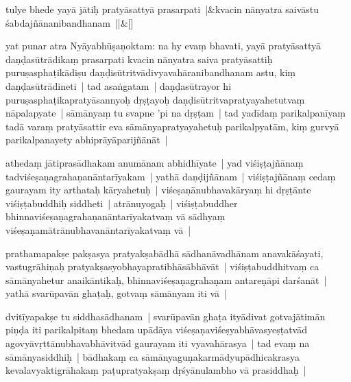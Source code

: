 \documentclass[article,12pt,a4paper]{memoir}%
\newcounter{parCount}
\begin{document}
	    
	    \stanza[\smallbreak]
	  tulye bhede yayā jātiḥ pratyāsattyā prasarpati |&kvacin nānyatra saivāstu śabdajñānanibandhanam ||\&[\smallbreak]
	  
	  
	  

	  
	  \pstart \leavevmode%
	\label{thakur75-64.24}yat punar atra Nyāyabhūṣaṇoktam: na hy evaṃ bhavati, yayā pratyāsattyā daṇḍasūtrādikaṃ prasarpati kvacin nānyatra saiva pratyāsattiḥ puruṣasphaṭikādiṣu daṇḍisūtritvādivyavahāranibandhanam astu, kiṃ daṇḍasūtrādineti | tad asaṅgatam | daṇḍasūtrayor hi puruṣasphaṭikapratyāsannyoḥ dṛṣṭayoḥ daṇḍisūtritvapratyayahetutvaṃ nāpalapyate | sāmānyaṃ tu svapne 'pi na dṛṣṭam | tad yadīdaṃ parikalpanīyaṃ tadā varaṃ pratyāsattir eva sāmānyapratyayahetuḥ parikalpyatām, kiṃ gurvyā parikalpanayety abhiprāyāparijñānāt |
	{}
	\pend%
      

	  
	  \pstart \leavevmode%
	\label{thakur75-65.1} athedaṃ jātiprasādhakam anumānam abhidhīyate | yad viśiṣṭajñānaṃ tadviśeṣaṇagrahaṇanāntarīyakam | yathā daṇḍijñānam | viśiṣṭajñānaṃ cedaṃ gaurayam ity arthataḥ kāryahetuḥ | viśeṣaṇānubhavakāryaṃ hi dṛṣṭānte viśiṣṭabuddhiḥ siddheti | atrānuyogaḥ | viśiṣṭabuddher bhinnaviśeṣaṇagrahaṇanāntarīyakatvaṃ vā sādhyaṃ viśeṣaṇamātrānubhavanāntarīyakatvaṃ vā |
	{}
	\pend%
      

	  
	  \pstart \leavevmode%
	\label{thakur75-65.6} prathamapakṣe pakṣasya pratyakṣabādhā sādhanāvadhānam anavakāśayati, vastugrāhiṇaḥ pratyakṣasyobhayapratibhāsābhāvāt | viśiṣṭabuddhitvaṃ ca sāmānyahetur anaikāntikaḥ, bhinnaviśeṣaṇagrahaṇam antareṇāpi darśanāt | yathā svarūpavān ghaṭaḥ, gotvaṃ sāmānyam iti vā |
	{}
	\pend%
      

	  
	  \pstart \leavevmode%
	\label{thakur75-65.10} dvitīyapakṣe tu siddhasādhanam | svarūpavān ghaṭa ityādivat gotvajātimān piṇḍa iti parikalpitaṃ bhedam upādāya viśeṣaṇaviśeṣyabhāvasyeṣṭatvād agovyāvṛttānubhavabhāvitvād gaurayam iti vyavahārasya | tad evaṃ na sāmānyasiddhiḥ | bādhakaṃ ca sāmānyaguṇakarmādyupādhicakrasya kevalavyaktigrāhakaṃ paṭupratyakṣaṃ dṛśyānulambho vā prasiddhaḥ |
	{}
	\pend%
      
\end{document}
